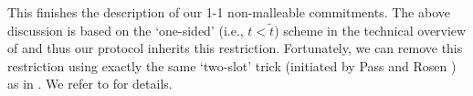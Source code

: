 This finishes the description of our 1-1 non-malleable commitments. The above discussion is based on the `one-sided' (i.e., $t < \tilde{t}$) scheme in the technical overview of \cite{FOCS:LPY23} and thus our protocol inherits this restriction. Fortunately, we can remove this restriction using exactly the same `two-slot' trick (initiated by Pass and Rosen \cite{STOC:PasRos05}) as in \cite{FOCS:LPY23}. We refer to  for details.




